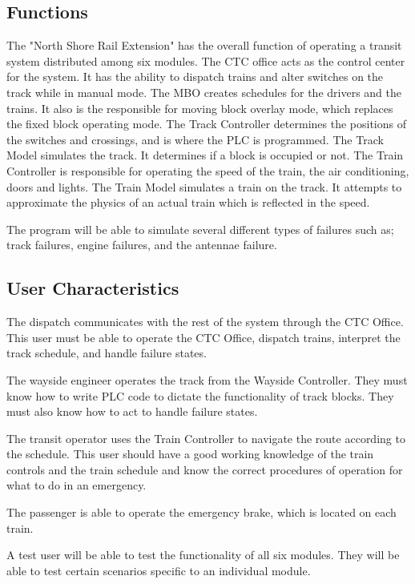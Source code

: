 \documentclass[11pt]{article}
\begin{document}
\subsection{Functions}
\label{sec-2-2}
The "North Shore Rail Extension" has the overall function of operating a transit system distributed among six modules. The CTC office acts as the control center for the system. It has the ability to dispatch trains and alter switches on the track while in manual mode. The MBO creates schedules for the drivers and the trains. It also is the responsible for moving block overlay mode, which replaces the fixed block operating mode. The Track Controller determines the positions of the switches and crossings, and is where the PLC is programmed. The Track Model simulates the track. It determines if a block is occupied or not. The Train Controller is responsible for operating the speed of the train, the air conditioning, doors and lights. The Train Model simulates a train on the track. It attempts to approximate the physics of an actual train which is reflected in the speed.

The program will be able to simulate several different types of failures such as; track failures, engine failures, and the antennae failure.

\subsection{User Characteristics}
\label{sec-2-3}
The dispatch communicates with the rest of the system through the CTC Office. This user must be able to operate the CTC Office, dispatch trains, interpret the track schedule, and handle failure states. 

The wayside engineer operates the track from the Wayside Controller. They must know how to write PLC code to dictate the functionality of track blocks. They must also know how to act to handle failure states. 

The transit operator uses the Train Controller to navigate the route according to the schedule. This user should have a good working knowledge of the train controls and the train schedule and know the correct procedures of operation for what to do in an emergency.

The passenger is able to operate the emergency brake, which is located on each train.

A test user will be able to test the functionality of all six modules. They will be able to test certain scenarios specific to an individual module.  
\end{document}
